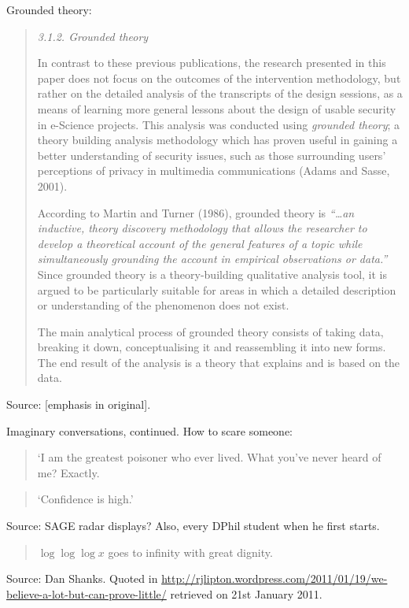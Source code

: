 \documentclass[a4paper]{article}
\begin{document}
Grounded theory:
\begin{quotation}
{\it 3.1.2. Grounded theory}

In contrast to these previous publications, the research
presented in this paper does not focus on the outcomes of
the intervention methodology, but rather on the detailed
analysis of the transcripts of the design sessions, as a means
of learning more general lessons about the design of usable
security in e-Science projects.  This analysis was conducted
using {\it grounded theory}; a theory building analysis methodology
which has proven useful in gaining a better
understanding of security issues, such as those surrounding
users' perceptions of privacy in multimedia communications
(Adams and Sasse, 2001).

According to Martin and Turner (1986), grounded
theory is \emph{``\ldots an inductive, theory discovery methodology
that allows the researcher to develop a theoretical account of
the general features of a topic while simultaneously
grounding the account in empirical observations or data.''}
Since grounded theory is a theory-building qualitative
analysis tool, it is argued to be particularly suitable for
areas in which a detailed description or understanding of
the phenomenon does not exist.

The main analytical process of grounded theory consists
of taking data, breaking it down, conceptualising it and
reassembling it into new forms.  The end result of the
analysis is a theory that explains and is based on the data.
\end{quotation}
Source: \citet[p.~284]{Flechais2009} [emphasis in original].
\medskip

Imaginary conversations, continued.  How to scare someone:
\begin{quote}
	`I am the greatest poisoner who ever lived.  What you've
	never heard of me?  Exactly.
\end{quote}
\medskip

\begin{quote}
	`Confidence is high.'
\end{quote}
Source: SAGE radar displays?  Also, every DPhil student when he first starts.
\medskip

\begin{quote}
	$\log\log\log x$ goes to infinity with great dignity.
\end{quote}
Source: Dan Shanks.  Quoted in
\url{http://rjlipton.wordpress.com/2011/01/19/we-believe-a-lot-but-can-prove-little/}
retrieved on 21st January 2011.
\medskip
\end{document}
